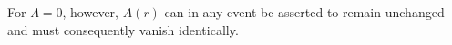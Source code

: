 For $\Lambda=0$, however, $A(r)$ can in any event be asserted to remain unchanged and must consequently vanish identically.
